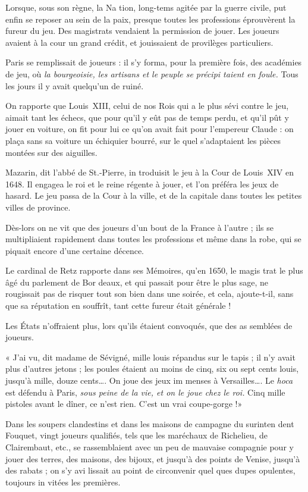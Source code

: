 Lorsque, sous son règne, la Na%
tion, long-tems agitée par la guerre
civile, put enfin se reposer au sein de
la paix, presque toutes les professions
éprouvèrent la fureur du jeu. Des
magistrats vendaient la permission
de jouer. Les joueurs avaient à la
cour un grand crédit, et jouissaient
de provilèges particuliers.

Paris se remplissait de joueurs : il
s'y forma, pour la première fois, des
académies de jeu, où \emph{la bourgeoisie,
les artisans et le peuple se précipi%
taient en foule.} Tous les jours il y
avait quelqu'un de ruiné.

On rapporte que Louis~XIII, celui
de nos Rois qui a le plus sévi contre
le jeu, aimait tant les échecs, que
pour qu'il y eût pas de temps perdu,
et qu'il pût y jouer en voiture, on
fit pour lui ce qu'on avait fait pour
l'empereur Claude : on plaça sans sa
voiture un échiquier bourré, sur le%
quel s'adaptaient les pièces montées
sur des aiguilles.

Mazarin, dit l'abbé de St.-Pierre, in%
troduisit le jeu à la Cour de Louis~XIV
en 1648. Il engagea le roi et le reine
régente à jouer, et l'on préféra les jeux
de hasard. Le jeu passa de la Cour à la
ville, et de la capitale dans toutes les
petites villes de province.

Dès-lors on ne vit que des joueurs
d'un bout de la France à l'autre ; ils se
multipliaient rapidement dans toutes
les professions et même dans la robe,
qui se piquait encore d'une certaine
décence.

Le cardinal de Retz rapporte dans
ses Mémoires, qu'en 1650, le magis%
trat le plus âgé du parlement de Bor%
deaux, et qui passait pour être le plus
sage, ne rougissait pas de risquer tout
son bien dans une soirée, et cela,
ajoute-t-il, sans que sa réputation
en souffrît, tant cette fureur était
générale !

Les États n'offraient plus, lors%
qu'ils étaient convoqués, que des as%
semblées de joueurs.

« J'ai vu, dit madame de Sévigné,
mille louis répandus sur le tapis ; il
n'y avait plus d'autres jetons ; les
poules étaient au moins de cinq, six
ou sept cents louis, jusqu'à mille,
douze cents…. On joue des jeux im%
menses à Versailles…. Le \emph{hoca} est
défendu à Paris, \emph{sous peine de la
vie, et on le joue chez le roi.} Cinq
mille pistoles avant le dîner, ce n'est
rien. C'est un vrai coupe-gorge !»

Dans les soupers clandestins et dans
les maisons de campagne du surinten%
dent Fouquet, vingt joueurs qualifiés,
tels que les maréchaux de Richelieu,
de Clairembaut, etc., se rassemblaient
avec un peu de mauvaise compagnie
pour y jouer des terres, des maisons,
des bijoux, et jusqu'à des points de
Venise, jusqu'à des rabats ; on s'y avi%
lissait au point de circonvenir quel%
ques dupes opulentes, toujours in%
vitées les premières.

